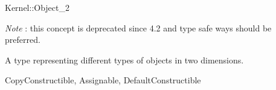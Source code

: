 \begin{ccRefConcept}{Kernel::Object_2}
\begin{ccDeprecated}
{\em Note} : this concept is deprecated since 4.2 and type safe ways should be preferred. 

A type representing different types of objects in two dimensions.

\ccRefines
CopyConstructible, Assignable, DefaultConstructible 

\ccSeeAlso
{} \\
\\
 \\
 \\
\end{ccDeprecated}
\end{ccRefConcept}
